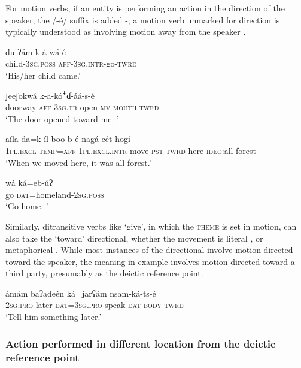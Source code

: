 \documentclass[output=paper]{langsci/langscibook}
\begin{document}
For motion verbs, if an entity is performing an action in the direction of the speaker, the /-é/ suffix is added -; a motion verb unmarked for direction is typically understood as involving motion away from the speaker . 

\ea\label{ex:ahlandc:29}
\gll
du-ʔám  k-á-wá-é \\
child{}-\textsc{3sg.poss}  \textsc{aff-3sg.intr}{}-go-\textsc{twrd} \\
\glt
‘His/her child came.’
\z

\ea\label{ex:ahlandc:30}
\gll
ʃeeʃokwá  k-a-k\'{o}\textsf{ꜜ}ɗ{}-áá-s-é \\
doorway  \textsc{aff-3sg.tr}{}-open-\textsc{mv-mouth-twrd} \\ 
\glt
‘The door opened toward me. ’
\z

\ea\label{ex:ahlandc:31}
\gll
aíla  da=k-íl-boo-b-é  nagá cét  hogí \\
\textsc{1pl.excl}  \textsc{temp=aff-1pl.excl.intr}{}-move-\textsc{pst-twrd}  here  \textsc{ideo}:all  forest \\
\glt
‘When we moved here, it was all forest.’
\z

\ea\label{ex:ahlandc:32}
\gll
wá ká=eb-\'{u}ʔ  \\
go  \textsc{dat}=homeland-\textsc{2sg.poss} \\
\glt
‘Go home. ’  
\z

Similarly, ditransitive verbs like ‘give’, in which the \textsc{theme} is set in motion, can also take the ‘toward’ directional, whether the movement is literal ,  or metaphorical . While most instances of the directional involve motion directed toward the speaker, the meaning in example  involves motion directed toward a third party, presumably as the deictic reference point.

\ea\label{ex:ahlandc:33}
\gll
ámám  baʔadeén  ká=jarʕám  nsam-ká-ts-é  \\
\textsc{2sg.pro}  later  \textsc{dat=3sg.pro}  speak-\textsc{dat-body-twrd} \\
\glt
‘Tell him something later.’
\z


\subsubsection{Action performed in different location from the deictic reference point}\label{sec:ahlandc:4.6.2}
\end{document}
